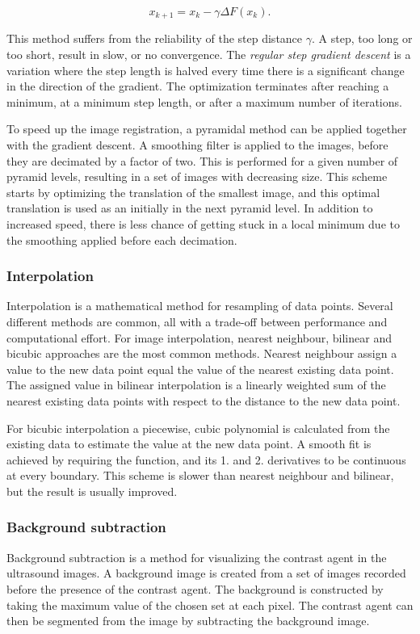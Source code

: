 \begin{equation}
\label{gradient descent}
x_{k+1} = x_k - \gamma \Delta F(x_k).
\end{equation}

This method suffers from the reliability of the step distance $\gamma$. A step, too long or too short, result in slow, or no convergence. The \textit{regular step gradient descent} is a variation where the step length is halved every time there is a significant change in the direction of the gradient. The optimization terminates after reaching a minimum, at a minimum step length, or after a maximum number of iterations.

To speed up the image registration, a pyramidal method can be applied together with the gradient descent. A smoothing filter is applied to the images, before they are decimated by a factor of two. This is performed for a given number of pyramid levels, resulting in a set of images with decreasing size. This scheme starts by optimizing the translation of the smallest image, and this optimal translation is used as an initially in the next pyramid level. In addition to increased speed, there is less chance of getting stuck in a local minimum due to the smoothing applied before each decimation.
 
\subsubsection{Interpolation}
Interpolation is a mathematical method for resampling of data points. Several different methods are common, all with a trade-off between performance and computational effort. For image interpolation, nearest neighbour, bilinear and bicubic approaches are the most common methods. Nearest neighbour assign a value to the new data point equal the value of the nearest existing data point. The assigned value in bilinear interpolation is a linearly weighted sum of the nearest existing data points with respect to the distance to the new data point. 

For bicubic interpolation a piecewise, cubic polynomial is calculated from the existing data to estimate the value at the new data point. A smooth fit is achieved by requiring the function, and its 1. and 2. derivatives to be continuous at every boundary. This scheme is slower than nearest neighbour and bilinear, but the result is usually improved.  

\subsubsection{Background subtraction}
Background subtraction is a method for visualizing the contrast agent in the ultrasound images. A background image is created from a set of images recorded before the presence of the contrast agent. The background is constructed by taking the maximum value of the chosen set at each pixel. The contrast agent can then be segmented from the image by subtracting the background image. 

